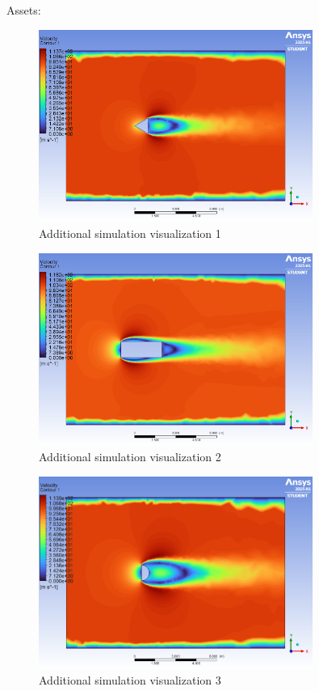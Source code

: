 \documentclass[12pt,a4paper]{article}
\begin{document}
Assets:

\begin{figure}[H]
\centering
\includegraphics[width=0.8\textwidth]{image3.png}
\caption{Additional simulation visualization 1}
\label{fig:asset1}
\end{figure}

\begin{figure}[H]
\centering
\includegraphics[width=0.8\textwidth]{image10.png}
\caption{Additional simulation visualization 2}
\label{fig:asset2}
\end{figure}

\begin{figure}[H]
\centering
\includegraphics[width=0.8\textwidth]{image16.png}
\caption{Additional simulation visualization 3}
\label{fig:asset3}
\end{figure}
\end{document}
